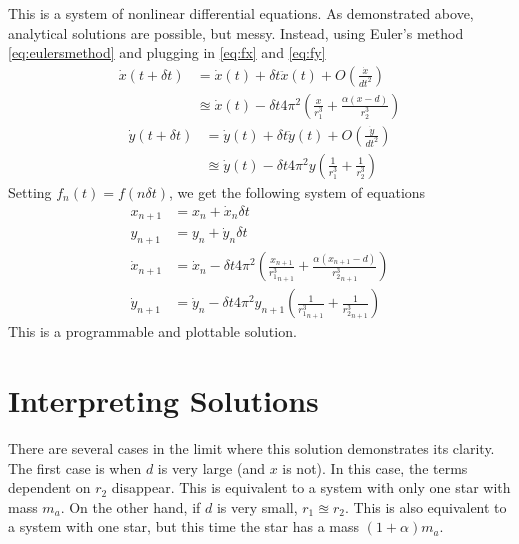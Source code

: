 \documentclass[preprint,titlepage,preprintnumbers,amsmath,amssymb,aps,11pt]{revtex4-2}
\begin{document}
This is a system of nonlinear differential equations. As demonstrated above, analytical solutions are possible, but messy. Instead, using Euler's method \ref{eq:eulersmethod} and plugging in \ref{eq:fx} and \ref{eq:fy}
\begin{equation}
    \begin{aligned}
        \dot{x}(t+\delta t) & =\dot{x}(t)+\delta t\ddot{x}(t)+O(\frac{\dot{x}}{dt^2})                       \\
                            & \approxeq\dot{x}(t)-\delta t4\pi^2(\frac{x}{r_1^3}+\frac{\alpha(x-d)}{r_2^3})
    \end{aligned}
\end{equation}
\begin{equation}
    \begin{aligned}
        \dot{y}(t+\delta t) & =\dot{y}(t)+\delta t\ddot{y}(t)+O(\frac{\dot{y}}{dt^2})              \\
                            & \approxeq\dot{y}(t)-\delta t4\pi^2y(\frac{1}{r_1^3}+\frac{1}{r_2^3})
    \end{aligned}
\end{equation}
Setting $f_n(t)=f(n\delta t)$, we get the following system of equations
\begin{equation}
    \begin{aligned}
        x_{n+1}       & =x_n+\dot{x}_n\delta t                                                                           \\
        y_{n+1}       & =y_n+\dot{y}_n\delta t                                                                           \\
        \dot{x}_{n+1} & =\dot{x}_n-\delta t4\pi^2(\frac{x_{n+1}}{{r_1^3}_{n+1}}+\frac{\alpha(x_{n+1}-d)}{{r_2^3}_{n+1}}) \\
        \dot{y}_{n+1} & =\dot{y}_n-\delta t4\pi^2y_{n+1}(\frac{1}{{r_1^3}_{n+1}}+\frac{1}{{r_2^3}_{n+1}})
    \end{aligned}
\end{equation}
This is a programmable and plottable solution.

\section{Interpreting Solutions}
There are several cases in the limit where this solution demonstrates its clarity. The first case is when $d$ is very large (and $x$ is not). In this case, the terms dependent on $r_2$ disappear. This is equivalent to a system with only one star with mass $m_a$. On the other hand, if $d$ is very small, $r_1\approxeq r_2$. This is also equivalent to a system with one star, but this time the star has a mass $(1+\alpha)m_a$.
\end{document}
